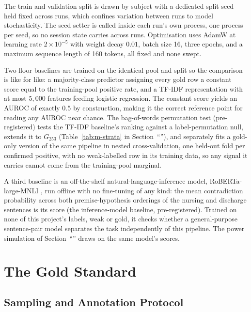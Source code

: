  The train and validation split is drawn by
subject with a dedicated split seed held fixed across runs, which confines variation between runs
to model stochasticity. The seed setter is called inside each
run's own process, one process per seed, so no session state carries across runs. Optimisation uses
AdamW at learning rate $2\times 10^{-5}$ with weight decay $0.01$, batch size 16, three epochs, and a
maximum sequence length of 160 tokens, all fixed and none swept.

Two floor baselines are trained on the identical pool and split so the comparison is like for like:
a majority-class predictor assigning every gold row a constant score equal to the training-pool
positive rate, and a TF-IDF representation with at most $5{,}000$ features feeding logistic
regression. The constant score yields an AUROC of exactly $0.5$ by construction, making it the
correct reference point for reading any AUROC near chance. The bag-of-words permutation test
(pre-registered) tests the TF-IDF baseline's ranking against a label-permutation null, extends it to
$G_{253}$ (Table~\ref{tab:m-strata} in Section~``''), and separately fits a gold-only version of the same pipeline
in nested cross-validation, one held-out fold per confirmed positive, with no weak-labelled row in its training data, so any signal it carries cannot come from the training-pool marginal.

A third baseline is an off-the-shelf natural-language-inference model, RoBERTa-large-MNLI
\citep{liu2019roberta}, run offline with no fine-tuning of any kind: the mean contradiction
probability across both premise-hypothesis orderings of the nursing and discharge sentences is its
score (the inference-model baseline, pre-registered). Trained on none of this project's labels, weak or gold, it checks whether a general-purpose
sentence-pair model separates the task independently of this pipeline. The
power simulation of Section~``'' draws on the same model's scores.

\section{The Gold Standard}
\label{sec:m-gold}

\subsection{Sampling and Annotation Protocol}


